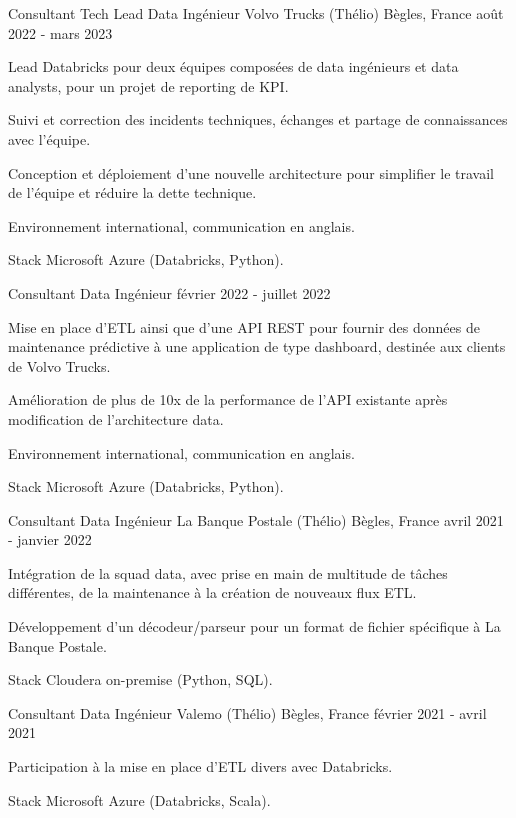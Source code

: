 \begin{cventries}
	\cventry
	{Consultant Tech Lead Data Ingénieur}
	{Volvo Trucks (Thélio)}
	{Bègles, France}
	{août 2022 - mars 2023}
	{
		\begin{cvitems}
			\item {Lead Databricks pour deux équipes composées de data ingénieurs et data analysts, pour un projet de reporting de KPI.}
			\item {Suivi et correction des incidents techniques, échanges et partage de connaissances avec l'équipe.}
			\item {Conception et déploiement d'une nouvelle architecture pour simplifier le travail de l'équipe et réduire la dette technique.}
			\item {Environnement international, communication en anglais.}
			\item {Stack Microsoft Azure (Databricks, Python).}
		\end{cvitems}
	}
	
	\cventry
	{Consultant Data Ingénieur}{}{}
	{février 2022 - juillet 2022}
	{
		\begin{cvitems}
			\item {Mise en place d'ETL ainsi que d'une API REST pour fournir des données de maintenance prédictive à une application de type dashboard, destinée aux clients de Volvo Trucks.}
			\item {Amélioration de plus de 10x de la performance de l'API existante après modification de l'architecture data.}
			\item {Environnement international, communication en anglais.}
			\item {Stack Microsoft Azure (Databricks, Python).}
		\end{cvitems}
	}
	
	\cventry
	{Consultant Data Ingénieur}
	{La Banque Postale (Thélio)}
	{Bègles, France}
	{avril 2021 - janvier 2022}
	{
		\begin{cvitems}
			\item {Intégration de la squad data, avec prise en main de multitude de tâches différentes, de la maintenance à la création de nouveaux flux ETL.}
			\item {Développement d'un décodeur/parseur pour un format de fichier spécifique à La Banque Postale.}
			\item {Stack Cloudera on-premise (Python, SQL).}
		\end{cvitems}
	}
	
	\newpage

	\cventry
	{Consultant Data Ingénieur}
	{Valemo (Thélio)}
	{Bègles, France}
	{février 2021 - avril 2021}
	{
		\begin{cvitems}
			\item {Participation à la mise en place d'ETL divers avec Databricks.}
			\item {Stack Microsoft Azure (Databricks, Scala).}
		\end{cvitems}
	}
	

\end{cventries}
